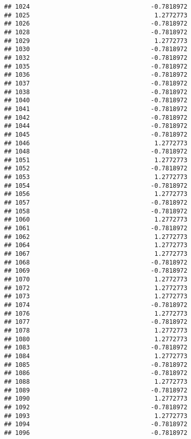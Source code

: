 \documentclass[
]{article}
\begin{document}
\begin{verbatim}
## 1024                                 -0.7818972
## 1025                                  1.2772773
## 1026                                 -0.7818972
## 1028                                 -0.7818972
## 1029                                  1.2772773
## 1030                                 -0.7818972
## 1032                                 -0.7818972
## 1035                                 -0.7818972
## 1036                                 -0.7818972
## 1037                                 -0.7818972
## 1038                                 -0.7818972
## 1040                                 -0.7818972
## 1041                                 -0.7818972
## 1042                                 -0.7818972
## 1044                                 -0.7818972
## 1045                                 -0.7818972
## 1046                                  1.2772773
## 1048                                 -0.7818972
## 1051                                  1.2772773
## 1052                                 -0.7818972
## 1053                                  1.2772773
## 1054                                 -0.7818972
## 1056                                  1.2772773
## 1057                                 -0.7818972
## 1058                                 -0.7818972
## 1060                                  1.2772773
## 1061                                 -0.7818972
## 1062                                  1.2772773
## 1064                                  1.2772773
## 1067                                  1.2772773
## 1068                                 -0.7818972
## 1069                                 -0.7818972
## 1070                                  1.2772773
## 1072                                  1.2772773
## 1073                                  1.2772773
## 1074                                 -0.7818972
## 1076                                  1.2772773
## 1077                                 -0.7818972
## 1078                                  1.2772773
## 1080                                  1.2772773
## 1083                                 -0.7818972
## 1084                                  1.2772773
## 1085                                 -0.7818972
## 1086                                 -0.7818972
## 1088                                  1.2772773
## 1089                                 -0.7818972
## 1090                                  1.2772773
## 1092                                 -0.7818972
## 1093                                  1.2772773
## 1094                                 -0.7818972
## 1096                                 -0.7818972

\end{verbatim}
\end{document}
